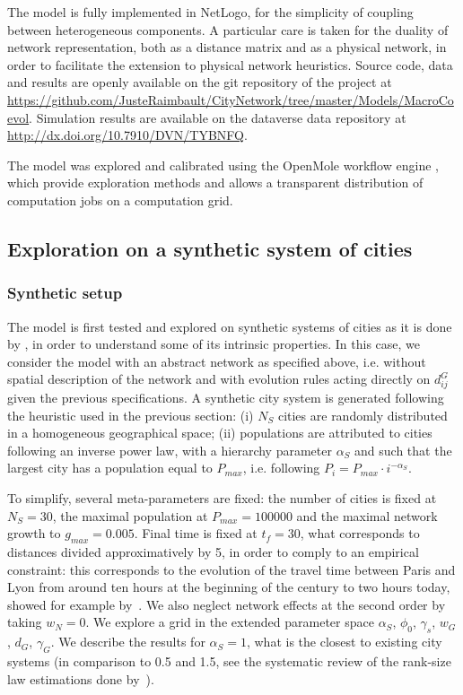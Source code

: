 The model is fully implemented in NetLogo, for the simplicity of coupling between heterogeneous components. A particular care is taken for the duality of network representation, both as a distance matrix and as a physical network, in order to facilitate the extension to physical network heuristics. Source code, data and results are openly available on the git repository of the project at \url{https://github.com/JusteRaimbault/CityNetwork/tree/master/Models/MacroCoevol}. Simulation results are available on the dataverse data repository at \url{http://dx.doi.org/10.7910/DVN/TYBNFQ}.

The model was explored and calibrated using the OpenMole workflow engine \citep{reuillon2013openmole}, which provide exploration methods and allows a transparent distribution of computation jobs on a computation grid.



\subsection{Exploration on a synthetic system of cities}

\subsubsection{Synthetic setup}

The model is first tested and explored on synthetic systems of cities as it is done by \cite{favaro2011gibrat}, in order to understand some of its intrinsic properties. In this case, we consider the model with an abstract network as specified above, i.e. without spatial description of the network and with evolution rules acting directly on $d^G_{ij}$ given the previous specifications. A synthetic city system is generated following the heuristic used in the previous section: (i) $N_S$ cities are randomly distributed in a homogeneous geographical space; (ii) populations are attributed to cities following an inverse power law, with a hierarchy parameter $\alpha_S$ and such that the largest city has a population equal to $P_{max}$, i.e. following $P_i = P_{max} \cdot i^{-\alpha_S}$.


To simplify, several meta-parameters are fixed: the number of cities is fixed at $N_S = 30$, the maximal population at $P_{max} = 100000$ and the maximal network growth to $g_{max} = 0.005$. Final time is fixed at $t_f = 30$, what corresponds to distances divided approximatively by 5, in order to comply to an empirical constraint: this corresponds to the evolution of the travel time between Paris and Lyon from around ten hours at the beginning of the century to two hours today, showed for example by~\cite{thevenin2013mapping}. We also neglect network effects at the second order by taking $w_N = 0$. We explore a grid in the extended parameter space $\alpha_S$, $\phi_0$, $\gamma_s$, $w_G$, $d_G$, $\gamma_G$. We describe the results for $\alpha_S = 1$, what is the closest to existing city systems (in comparison to 0.5 and 1.5, see the systematic review of the rank-size law estimations done by~\cite{10.1371/journal.pone.0183919}).


